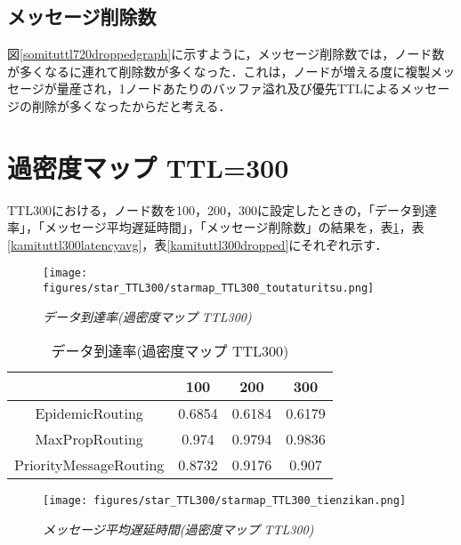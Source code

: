 \documentclass[11pt]{icsthesis}
\begin{document}
\subsection{メッセージ削除数}
図\ref{somituttl720droppedgraph}に示すように，メッセージ削除数では，ノード数が多くなるに連れて削除数が多くなった．これは，ノードが増える度に複製メッセージが量産され，1ノードあたりのバッファ溢れ及び優先TTLによるメッセージの削除が多くなったからだと考える．

\newpage

\section{過密度マップ TTL=300}
TTL300における，ノード数を100，200，300に設定したときの，「データ到達率」，「メッセージ平均遅延時間」，「メッセージ削除数」の結果を，表\ref{kamituttl300deliveryprob}，表\ref{kamituttl300latencyavg}，表\ref{kamituttl300dropped}にそれぞれ示す．

\begin{figure}[h]
\centering
\texttt{[image: figures/star\_TTL300/starmap\_TTL300\_toutaturitsu.png]}
\caption[]{\it{データ到達率(過密度マップ TTL300)}}
\label{kamituttl300deliveryprobgraph}
\end{figure}

\begin{table}[H]
 \begin{center}
      \caption[]{データ到達率(過密度マップ TTL300)}
      \label{kamituttl300deliveryprob}
      \begin{tabular}{|c|c|c|c|}
\hline
&100&200&300\\
\hline
EpidemicRouting&0.6854&0.6184&0.6179\\
\hline
MaxPropRouting&0.974&0.9794&0.9836\\
\hline
PriorityMessageRouting&0.8732&0.9176&0.907\\
\hline
      \end{tabular}
    \end{center}
\end{table}

\newpage

\begin{figure}[h]
\centering
\texttt{[image: figures/star\_TTL300/starmap\_TTL300\_tienzikan.png]}
\caption[]{\it{メッセージ平均遅延時間(過密度マップ TTL300)}}
\label{kamituttl300latencyavggraph}
\end{figure}
\end{document}
